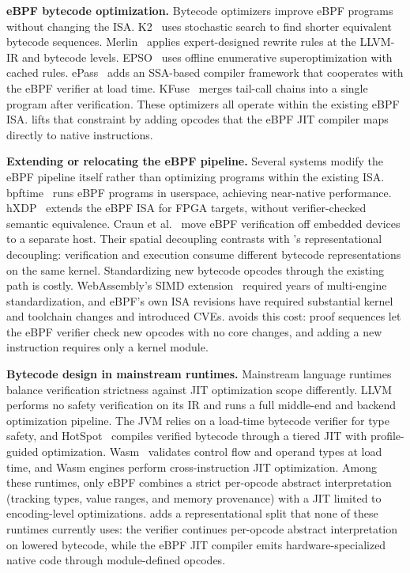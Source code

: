 \noindent\textbf{eBPF bytecode optimization.}
Bytecode optimizers improve eBPF programs without changing the ISA. K2~\cite{xu2021synthesizing} uses stochastic search to find shorter equivalent bytecode sequences. Merlin~\cite{mao2024merlin} applies expert-designed rewrite rules at the LLVM-IR and bytecode levels. EPSO~\cite{zhu2025epso} uses offline enumerative superoptimization with cached rules. ePass~\cite{xiang2025epass} adds an SSA-based compiler framework that cooperates with the eBPF verifier at load time. KFuse~\cite{kfuse} merges tail-call chains into a single program after verification. These optimizers all operate within the existing eBPF ISA. \lang lifts that constraint by adding opcodes that the eBPF JIT compiler maps directly to native instructions.

\noindent\textbf{Extending or relocating the eBPF pipeline.}
Several systems modify the eBPF pipeline itself rather than optimizing programs within the existing ISA. bpftime~\cite{zheng2025extending} runs eBPF programs in userspace, achieving near-native performance. hXDP~\cite{brunella2020hxdp} extends the eBPF ISA for FPGA targets, without verifier-checked semantic equivalence. Craun et al.~\cite{craun2023enabling} move eBPF verification off embedded devices to a separate host. Their spatial decoupling contrasts with \lang's representational decoupling: verification and execution consume different bytecode representations on the same kernel. Standardizing new bytecode opcodes through the existing path is costly. WebAssembly's SIMD extension~\cite{haas2017bringing} required years of multi-engine standardization, and eBPF's own ISA revisions have required substantial kernel and toolchain changes and introduced CVEs. \lang avoids this cost: proof sequences let the eBPF verifier check new opcodes with no core changes, and adding a new instruction requires only a kernel module.

\noindent\textbf{Bytecode design in mainstream runtimes.}
Mainstream language runtimes balance verification strictness against JIT optimization scope differently. LLVM~\cite{lattner2004llvm} performs no safety verification on its IR and runs a full middle-end and backend optimization pipeline. The JVM relies on a load-time bytecode verifier for type safety, and HotSpot~\cite{paleczny2001java} compiles verified bytecode through a tiered JIT with profile-guided optimization. Wasm~\cite{haas2017bringing} validates control flow and operand types at load time, and Wasm engines perform cross-instruction JIT optimization. Among these runtimes, only eBPF combines a strict per-opcode abstract interpretation (tracking types, value ranges, and memory provenance) with a JIT limited to encoding-level optimizations. \lang adds a representational split that none of these runtimes currently uses: the verifier continues per-opcode abstract interpretation on lowered bytecode, while the eBPF JIT compiler emits hardware-specialized native code through module-defined opcodes.

